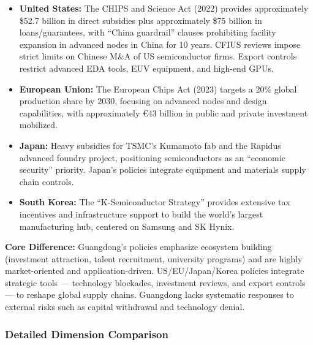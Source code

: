 \documentclass[12pt,a4paper]{article}
\begin{document}
\begin{itemize}
    \item \textbf{United States:} The CHIPS and Science Act (2022)
          provides approximately \$52.7 billion in direct subsidies plus
          approximately \$75 billion in loans/guarantees, with ``China
          guardrail'' clauses prohibiting facility expansion in advanced
          nodes in China for 10 years. CFIUS reviews impose strict limits
          on Chinese M\&A of US semiconductor firms. Export controls
          restrict advanced EDA tools, EUV equipment, and high-end GPUs.
    \item \textbf{European Union:} The European Chips Act (2023) targets
          a 20\% global production share by 2030, focusing on advanced
          nodes and design capabilities, with approximately €43 billion
          in public and private investment mobilized.
    \item \textbf{Japan:} Heavy subsidies for TSMC's Kumamoto fab and
          the Rapidus advanced foundry project, positioning semiconductors
          as an ``economic security'' priority. Japan's policies integrate
          equipment and materials supply chain controls.
    \item \textbf{South Korea:} The ``K-Semiconductor Strategy'' provides
          extensive tax incentives and infrastructure support to build
          the world's largest manufacturing hub, centered on Samsung and
          SK Hynix.
\end{itemize}

\textbf{Core Difference:} Guangdong's policies emphasize ecosystem
building (investment attraction, talent recruitment, university programs)
and are highly market-oriented and application-driven. US/EU/Japan/Korea
policies integrate strategic tools — technology blockades, investment
reviews, and export controls — to reshape global supply chains. Guangdong
lacks systematic responses to external risks such as capital withdrawal
and technology denial.

\subsubsection{Detailed Dimension Comparison}
\end{document}
